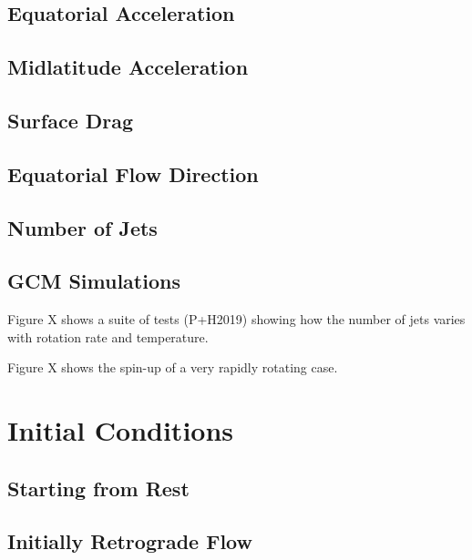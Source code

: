 \subsection*{Equatorial Acceleration}

\subsection*{Midlatitude Acceleration}

\subsection*{Surface Drag}

\subsection*{Equatorial Flow Direction}

\subsection*{Number of Jets}

\subsection*{GCM Simulations}

Figure X shows a suite of tests (P+H2019) showing how the number of jets varies with rotation rate and temperature.

Figure X shows the spin-up of a very rapidly rotating case.








\section{Initial Conditions}


\subsection*{Starting from Rest}

\subsection*{{Initially Retrograde Flow}}

